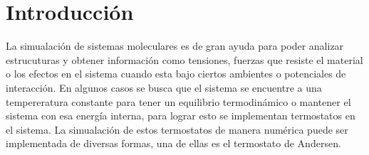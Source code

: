 \section{Introducción}
La simualación de sistemas moleculares es de gran ayuda para poder analizar estrucuturas y obtener información como tensiones, fuerzas
que resiste el material o los efectos en el sistema cuando esta bajo ciertos ambientes o potenciales de interacción. En algunos casos
se busca que el sistema se encuentre a una tempereratura constante para tener un equilibrio termodinámico o mantener el sistema con esa energía interna,
para lograr esto se implementan termostatos en el sistema. La simualación de estos termostatos de manera numérica puede ser implementada de
diversas formas, una de ellas es el termostato de Andersen.